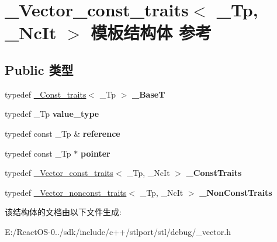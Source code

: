 \hypertarget{struct___vector__const__traits}{}\section{\+\_\+\+Vector\+\_\+const\+\_\+traits$<$ \+\_\+\+Tp, \+\_\+\+Nc\+It $>$ 模板结构体 参考}
\label{struct___vector__const__traits}
\subsection*{Public 类型}
\begin{DoxyCompactItemize}
\item 
\mbox{\label{struct___vector__const__traits_ae965e1ca839303ab2f85c89f99950eb1}} 
typedef \hyperlink{struct___const__traits}{\+\_\+\+Const\+\_\+traits}$<$ \+\_\+\+Tp $>$ {\bfseries \+\_\+\+BaseT}
\item 
\mbox{\label{struct___vector__const__traits_ad69e9c96aa9e3b9db883b47f389be9a9}} 
typedef \+\_\+\+Tp {\bfseries value\+\_\+type}
\item 
\mbox{\label{struct___vector__const__traits_a0b720ba99c2d02b1ee83f7d5f5b7173f}} 
typedef const \+\_\+\+Tp \& {\bfseries reference}
\item 
\mbox{\label{struct___vector__const__traits_ae611d7125ab5e39e2e84afa44f42f14d}} 
typedef const \+\_\+\+Tp $\ast$ {\bfseries pointer}
\item 
\mbox{\label{struct___vector__const__traits_a8eefc6341d0bea868b8c4cf27a975e54}} 
typedef \hyperlink{struct___vector__const__traits}{\+\_\+\+Vector\+\_\+const\+\_\+traits}$<$ \+\_\+\+Tp, \+\_\+\+Nc\+It $>$ {\bfseries \+\_\+\+Const\+Traits}
\item 
\mbox{\label{struct___vector__const__traits_ad4ed35c122accdf0c7b4352369fbf3c7}} 
typedef \hyperlink{struct___vector__nonconst__traits}{\+\_\+\+Vector\+\_\+nonconst\+\_\+traits}$<$ \+\_\+\+Tp, \+\_\+\+Nc\+It $>$ {\bfseries \+\_\+\+Non\+Const\+Traits}
\end{DoxyCompactItemize}


该结构体的文档由以下文件生成\+:\begin{DoxyCompactItemize}
\item 
E\+:/\+React\+O\+S-\/0../sdk/include/c++/stlport/stl/debug/\+\_\+vector.\+h\end{DoxyCompactItemize}

